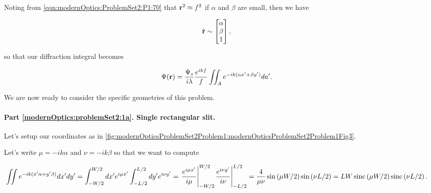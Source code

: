 {Noting from \cref{eqn:modernOptics:ProblemSet2:P1:70} that $\mathbf{r}^2 \approx f^2$ if $\alpha$ and $\beta$ are small, then we have

\begin{equation}\label{eqn:modernOptics:ProblemSet2:P1:170}
\hat{\mathbf{r}} \sim 
\begin{bmatrix}
\alpha \\
\beta \\
1
\end{bmatrix},
\end{equation}

so that our diffraction integral becomes

\begin{equation}\label{eqn:modernOptics:ProblemSet2:P1:190}
\Psi(\mathbf{r}) = \frac{\Psi_s}{i \lambda} \frac{e^{i k f}}{f} \iint_A e^{-i k ( \alpha x' + \beta y' ) } da'.
\end{equation}

We are now ready to consider the specific geometries of this problem.

\paragraph{Part \ref{modernOptics:problemSet2:1a}.  Single rectangular slit.}

Let's setup our coordinates as in \cref{fig:modernOpticsProblemSet2Problem1:modernOpticsProblemSet2Problem1Fig3}.


Let's write $\mu = -i k \alpha$ and $\nu = -i k \beta$ so that we want to compute

\begin{dmath}\label{eqn:modernOptics:ProblemSet2:P1:210}
\iint e^{-i k ( x' \alpha + y' \beta ) } dx' dy' 
=
\int_{-W/2}^{W/2} dx' e^{i \mu x'} 
\int_{-L/2}^{L/2} dy' e^{i \nu y'} 
=
\evalrange{ \frac{e^{i \mu x'}}{i \mu} }{-W/2}{W/2}
\evalrange{ \frac{e^{i \nu y'}}{i \nu} }{-L/2}{L/2}
=
\frac{4}{\mu\nu}
\sin\left( \mu W/2 \right)
\sin\left( \nu L/2 \right)
=
L W
\sinc\left( \mu W/2 \right)
\sinc\left( \nu L/2 \right).
\end{dmath}

}
